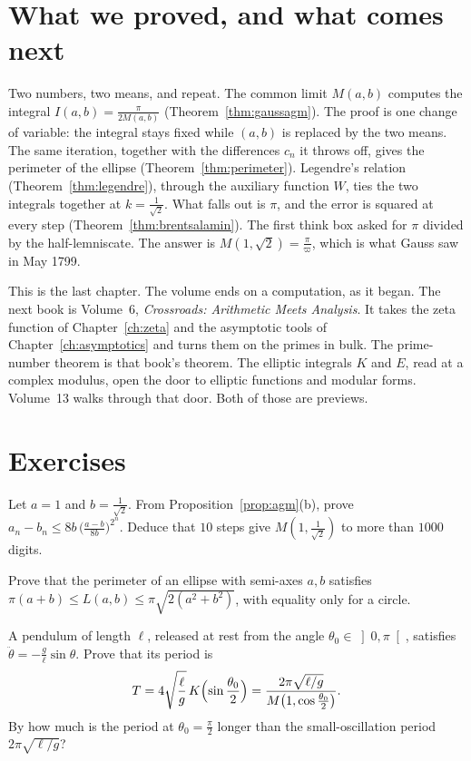\section{What we proved, and what comes next}

Two numbers, two means, and repeat. The common limit $M(a,b)$ computes the integral $I(a,b)=\frac\pi{2M(a,b)}$ (Theorem~\ref{thm:gaussagm}). The proof is one change of variable: the integral stays fixed while $(a,b)$ is replaced by the two means. The same iteration, together with the differences $c_n$ it throws off, gives the perimeter of the ellipse (Theorem~\ref{thm:perimeter}). Legendre's relation (Theorem~\ref{thm:legendre}), through the auxiliary function $W$, ties the two integrals together at $k=\frac1{\sqrt2}$. What falls out is $\pi$, and the error is squared at every step (Theorem~\ref{thm:brentsalamin}). The first think box asked for $\pi$ divided by the half-lemniscate. The answer is $M(1,\sqrt2)=\frac\pi\varpi$, which is what Gauss saw in May 1799.

This is the last chapter. The volume ends on a computation, as it began. The next book is Volume~6, \emph{Crossroads: Arithmetic Meets Analysis}. It takes the zeta function of Chapter~\ref{ch:zeta} and the asymptotic tools of Chapter~\ref{ch:asymptotics} and turns them on the primes in bulk. The prime-number theorem is that book's theorem. The elliptic integrals $K$ and $E$, read at a complex modulus, open the door to elliptic functions and modular forms. Volume~13 walks through that door. Both of those are previews.

\section{Exercises}

\begin{exercise}[$\star$]\label{ex:agmsteps}
Let $a=1$ and $b=\frac1{\sqrt2}$. From Proposition~\ref{prop:agm}(b), prove $a_n-b_n\le8b\,\bigl(\frac{a-b}{8b}\bigr)^{2^n}$. Deduce that $10$ steps give $M(1,\frac1{\sqrt2})$ to more than $1000$ digits.
\end{exercise}

\begin{exercise}[$\star$]\label{ex:eulerbounds}
Prove that the perimeter of an ellipse with semi-axes $a,b$ satisfies $\pi(a+b)\le L(a,b)\le\pi\sqrt{2(a^2+b^2)}$, with equality only for a circle.
\end{exercise}

\begin{exercise}[$\star\star$]\label{ex:pendulum}
A pendulum of length $\ell$, released at rest from the angle $\theta_0\in\left]0,\pi\right[$, satisfies $\ddot\theta=-\frac g\ell\sin\theta$. Prove that its period is
\[
T=4\sqrt{\frac\ell g}\,K\Bigl(\sin\frac{\theta_0}2\Bigr)=\frac{2\pi\sqrt{\ell/g}}{M\bigl(1,\cos\frac{\theta_0}2\bigr)}.
\]
By how much is the period at $\theta_0=\frac\pi2$ longer than the small-oscillation period $2\pi\sqrt{\ell/g}$?
\end{exercise}


